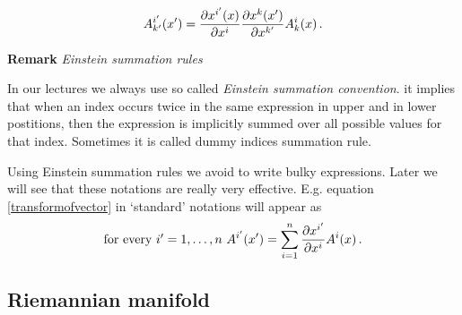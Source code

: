 \documentclass[12pt]{article}
\theoremstyle{theorem}
\numberwithin{equation}{section}
\begin{document}
             $$
    A^{i'}_{k'}(x')=        
{\partial x^{i'}(x)\over \partial x^{i}}{\partial x^k(x')\over \partial x^{k'}}A^i_k(x)\,.
             $$





{\bf Remark} {\it Einstein  summation rules}


 In our lectures we always use so called {\it Einstein summation convention}.
 it  implies that when an index occurs twice
in the same expression in upper and in lower postitions, then
 the expression is implicitly summed over all possible values
for that index.
  Sometimes it is called dummy indices summation rule.
 

   Using Einstein summation rules we avoid to write
bulky expressions. 
Later we will see that these notations are really very effective.
E.g. equation \eqref{transformofvector}
in `standard' notations will appear as
         $$
  \hbox {for every $i'=1,\dots,n$}\,\,
A^{i'}(x')=\sum_{i=1}^n{\partial x^{i'}\over \partial x^i}A^i(x)\,.
         $$ 

\subsection {Riemannian manifold}
\end{document}
